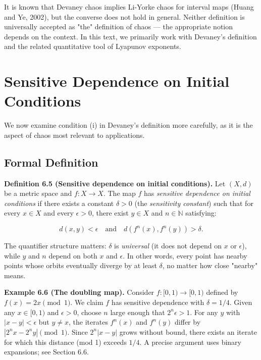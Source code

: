 It is known that Devaney chaos implies Li-Yorke chaos for interval maps (Huang and Ye, 2002), but the converse does not hold in general. Neither definition is universally accepted as "the" definition of chaos --- the appropriate notion depends on the context. In this text, we primarily work with Devaney's definition and the related quantitative tool of Lyapunov exponents.


\bigskip


\section{Sensitive Dependence on Initial Conditions}\label{sec:6.2}

We now examine condition (i) in Devaney's definition more carefully, as it is the aspect of chaos most relevant to applications.

\subsection{Formal Definition}\label{sec:6.2.1}

\textbf{Definition 6.5 (Sensitive dependence on initial conditions).} Let $(X, d)$ be a metric space and $f: X \to X$. The map $f$ has \textit{sensitive dependence on initial conditions} if there exists a constant $\delta > 0$ (the \textit{sensitivity constant}) such that for every $x \in X$ and every $\epsilon > 0$, there exist $y \in X$ and $n \in \mathbb{N}$ satisfying:

\[
d(x, y) < \epsilon \quad \text{and} \quad d(f^n(x), f^n(y)) > \delta.
\]

The quantifier structure matters: $\delta$ is \textit{universal} (it does not depend on $x$ or $\epsilon$), while $y$ and $n$ depend on both $x$ and $\epsilon$. In other words, every point has nearby points whose orbits eventually diverge by at least $\delta$, no matter how close "nearby" means.

\textbf{Example 6.6 (The doubling map).} Consider $f: [0,1) \to [0,1)$ defined by $f(x) = 2x \pmod{1}$. We claim $f$ has sensitive dependence with $\delta = 1/4$. Given any $x \in [0,1)$ and $\epsilon > 0$, choose $n$ large enough that $2^n \epsilon > 1$. For any $y$ with $|x - y| < \epsilon$ but $y \neq x$, the iterates $f^n(x)$ and $f^n(y)$ differ by $|2^n x - 2^n y| \pmod{1}$. Since $2^n |x - y|$ grows without bound, there exists an iterate for which this distance (mod 1) exceeds $1/4$. A precise argument uses binary expansions; see Section 6.6.

